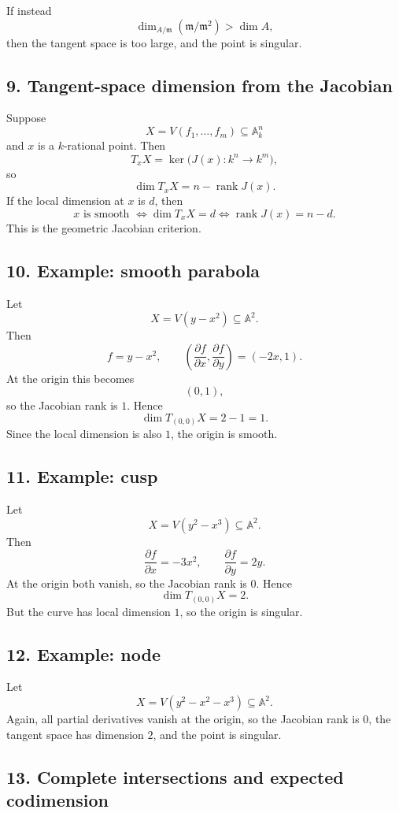 \documentclass[12pt,a4paper]{article}
\theoremstyle{plain}
\theoremstyle{definition}      %
\begin{document}
	If instead
	\[
	\dim_{A/\mathfrak m}(\mathfrak m/\mathfrak m^2)>\dim A,
	\]
	then the tangent space is too large, and the point is singular.
	
	\subsection*{9. Tangent-space dimension from the Jacobian}
	
	Suppose
	\[
	X=V(f_1,\dots,f_m)\subseteq \mathbb A^n_k
	\]
	and \(x\) is a \(k\)-rational point. Then
	\[
	T_xX=\ker\bigl(J(x):k^n\to k^m\bigr),
	\]
	so
	\[
	\dim T_xX=n-\operatorname{rank}J(x).
	\]
	If the local dimension at \(x\) is \(d\), then
	\[
	x \text{ is smooth }
	\iff
	\dim T_xX=d
	\iff
	\operatorname{rank}J(x)=n-d.
	\]
	This is the geometric Jacobian criterion.
	
	\subsection*{10. Example: smooth parabola}
	
	Let
	\[
	X=V(y-x^2)\subseteq \mathbb A^2.
	\]
	Then
	\[
	f=y-x^2,
	\qquad
	\left(\frac{\partial f}{\partial x},\frac{\partial f}{\partial y}\right)=(-2x,1).
	\]
	At the origin this becomes
	\[
	(0,1),
	\]
	so the Jacobian rank is \(1\). Hence
	\[
	\dim T_{(0,0)}X=2-1=1.
	\]
	Since the local dimension is also \(1\), the origin is smooth.
	
	\subsection*{11. Example: cusp}
	
	Let
	\[
	X=V(y^2-x^3)\subseteq \mathbb A^2.
	\]
	Then
	\[
	\frac{\partial f}{\partial x}=-3x^2,\qquad \frac{\partial f}{\partial y}=2y.
	\]
	At the origin both vanish, so the Jacobian rank is \(0\). Hence
	\[
	\dim T_{(0,0)}X=2.
	\]
	But the curve has local dimension \(1\), so the origin is singular.
	
	\subsection*{12. Example: node}
	
	Let
	\[
	X=V(y^2-x^2-x^3)\subseteq \mathbb A^2.
	\]
	Again, all partial derivatives vanish at the origin, so the Jacobian rank is \(0\), the tangent space has dimension \(2\), and the point is singular.
	
	\subsection*{13. Complete intersections and expected codimension}
	
\end{document}
